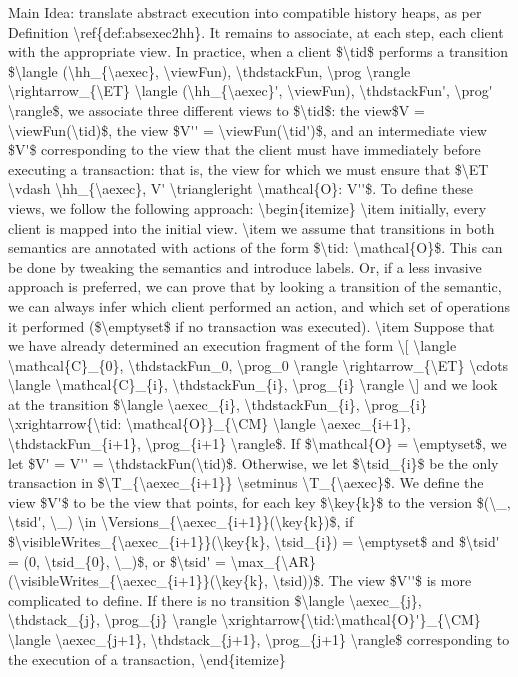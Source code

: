 \ac{Main Idea: translate abstract execution into compatible history heaps, as per 
Definition \ref{def:absexec2hh}. It remains to associate, at each step, 
each client with the appropriate view. In practice, when a client $\tid$ performs a transition 
$\langle (\hh_{\aexec}, \viewFun), \thdstackFun, \prog \rangle \rightarrow_{\ET} 
\langle (\hh_{\aexec}', \viewFun), \thdstackFun', \prog' \rangle$, 
we associate three different views to $\tid$: the view$V = \viewFun(\tid)$, the 
view $V'' = \viewFun(\tid')$, and 
an intermediate view $V'$ corresponding to the view that the client must have 
immediately before executing a transaction: that is, the view for which 
we must ensure that $\ET \vdash \hh_{\aexec}, V' \triangleright \mathcal{O}: V''$. 

To define these views, we follow the following approach: 
\begin{itemize}
\item initially, every client is mapped into the initial view. 
\item we assume that transitions in both semantics are annotated with actions of the form $\tid: \mathcal{O}$. 
This can be done by tweaking the semantics and introduce labels. Or, if a less invasive approach is preferred, 
we can prove that by looking a transition of the semantic, we can always infer which client performed an 
action, and which set of operations it performed ($\emptyset$ if no transaction was executed). 
\item Suppose that we have already determined an execution fragment of the form 
\[
\langle \mathcal{C}_{0}, \thdstackFun_0, \prog_0 \rangle \rightarrow_{\ET} \cdots \langle \mathcal{C}_{i}, \thdstackFun_{i}, \prog_{i} \rangle
\]
and we look at the transition $\langle \aexec_{i}, \thdstackFun_{i}, \prog_{i} \xrightarrow{\tid: \mathcal{O}}_{\CM} 
\langle \aexec_{i+1}, \thdstackFun_{i+1}, \prog_{i+1} \rangle$. If $\mathcal{O} = \emptyset$, we 
let $V' = V'' = \thdstackFun(\tid)$. Otherwise, we let $\tsid_{i}$ be the only transaction in $\T_{\aexec_{i+1}} \setminus 
\T_{\aexec}$. We define the view $V'$ to be the  
view that points, for each key $\key{k}$ to the version $(\_, \tsid', \_) \in \Versions_{\aexec_{i+1}}(\key{k})$, 
if $\visibleWrites_{\aexec_{i+1}}(\key{k}, \tsid_{i}) = \emptyset$ and $\tsid' = (0, \tsid_{0}, \_)$, or 
$\tsid' = \max_{\AR}(\visibleWrites_{\aexec_{i+1}}(\key{k}, \tsid))$. The view $V''$ is more complicated 
to define. If there is no transition $\langle \aexec_{j}, \thdstack_{j}, \prog_{j} \rangle \xrightarrow{\tid:\mathcal{O}'}_{\CM} 
\langle \aexec_{j+1}, \thdstack_{j+1}, \prog_{j+1} \rangle$ corresponding to the execution of a transaction, 

\end{itemize}}
